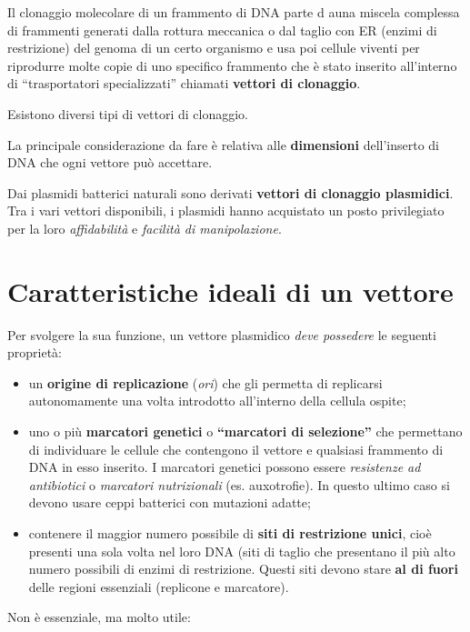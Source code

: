 \documentclass[11pt]{book}
\begin{document}
Il clonaggio molecolare di un frammento di DNA parte d auna miscela
complessa di frammenti generati dalla rottura meccanica o dal taglio con
ER (enzimi di restrizione) del genoma di un certo organismo e usa poi
cellule viventi per riprodurre molte copie di uno specifico frammento
che è stato inserito all'interno di ``trasportatori specializzati''
chiamati \textbf{vettori di clonaggio}.

Esistono diversi tipi di vettori di clonaggio.

La principale considerazione da fare è relativa alle \textbf{dimensioni}
dell'inserto di DNA che ogni vettore può accettare.

Dai plasmidi batterici naturali sono derivati \textbf{vettori di
clonaggio plasmidici}. Tra i vari vettori disponibili, i plasmidi hanno
acquistato un posto privilegiato per la loro \emph{affidabilità} e
\emph{facilità di manipolazione}.

\section{Caratteristiche ideali di un
vettore}\label{caratteristiche-ideali-di-un-vettore}

Per svolgere la sua funzione, un vettore plasmidico \emph{deve
possedere} le seguenti proprietà:

\begin{itemize}
\itemsep1pt\parskip0pt
\item
  un \textbf{origine di replicazione} (\emph{ori}) che gli permetta di
  replicarsi autonomamente una volta introdotto all'interno della
  cellula ospite;
\item
  uno o più \textbf{marcatori genetici} o \textbf{``marcatori di
  selezione''} che permettano di individuare le cellule che contengono
  il vettore e qualsiasi frammento di DNA in esso inserito. I marcatori
  genetici possono essere \emph{resistenze ad antibiotici} o
  \emph{marcatori nutrizionali} (es. auxotrofie). In questo ultimo caso
  si devono usare ceppi batterici con mutazioni adatte;
\item
  contenere il maggior numero possibile di \textbf{siti di restrizione
  unici}, cioè presenti una sola volta nel loro DNA (siti di taglio che
  presentano il più alto numero possibili di enzimi di restrizione.
  Questi siti devono stare \textbf{al di fuori} delle regioni essenziali
  (replicone e marcatore).
\end{itemize}

Non è essenziale, ma molto utile:
\end{document}
